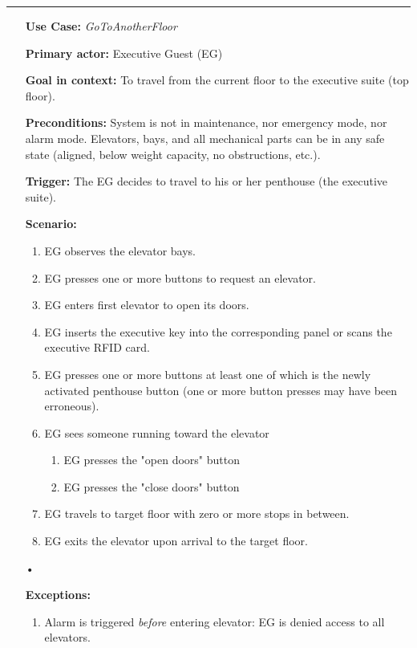 \documentclass[12pt]{article}
\begin{document}
		\par\noindent\rule{\textwidth}{0.4pt}
		\begin{itemize} %
			\item[] \textbf{Use Case:} \textit{GoToAnotherFloor}
			\item[] \textbf{Primary actor:} Executive Guest (EG)
			\item[] \textbf{Goal in context:} To travel from the current floor to the executive suite (top floor).
			\item[] \textbf{Preconditions:} System is not in maintenance, nor emergency mode, nor alarm mode. 
			Elevators, bays, and all mechanical parts can be in any safe state (aligned, below weight capacity, 
			no obstructions, etc.).
			\item[] \textbf{Trigger:} The EG decides to travel to his or her penthouse (the executive suite).
			\item[] { \textbf{Scenario:}
		        \begin{enumerate}
		        	\item EG observes the elevator bays.
		        	\item EG presses one or more buttons to request an elevator.
		        	\item EG enters first elevator to open its doors.
		        	\item EG inserts the executive key into the corresponding panel or scans the executive RFID card.
		        	\item EG presses one or more buttons at least one of which is the newly activated penthouse button (one or more 
		        	button presses may have been erroneous).
		        	\item{EG sees someone running toward the elevator
		        		\begin{enumerate}
		        			\item EG presses the "open doors" button
		        			\item EG presses the  "close doors" button
		        		\end{enumerate}}
		        	\item EG travels to target floor with zero or more stops in between.
		        	\item EG exits the elevator upon arrival to the target floor.
		        \end{enumerate}}
			\item[•]{\textbf{Exceptions:} 
			    \begin{enumerate}
		        	\item Alarm is triggered \textit{before} entering elevator: EG is denied access to all elevators.

\end{enumerate}}
\end{itemize}
\end{document}
